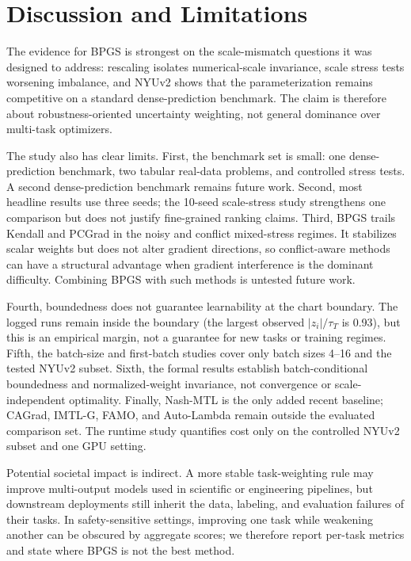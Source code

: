\section{Discussion and Limitations}
The evidence for BPGS is strongest on the scale-mismatch questions it was designed to address:
rescaling isolates numerical-scale invariance, scale stress tests worsening imbalance, and NYUv2
shows that the parameterization remains competitive on a standard dense-prediction benchmark. The
claim is therefore about robustness-oriented uncertainty weighting, not general dominance over
multi-task optimizers.

The study also has clear limits. First, the benchmark set is small: one dense-prediction
benchmark, two tabular real-data problems, and controlled stress tests. A second dense-prediction
benchmark remains future work. Second, most headline results use three seeds; the 10-seed
scale-stress study strengthens one comparison but does not justify fine-grained ranking claims.
Third, BPGS trails Kendall and PCGrad in the noisy and conflict mixed-stress regimes. It
stabilizes scalar weights but does not alter gradient directions, so conflict-aware methods can
have a structural advantage when gradient interference is the dominant difficulty. Combining BPGS
with such methods is untested future work.

Fourth, boundedness does not guarantee learnability at the chart boundary. The logged runs remain
inside the boundary (the largest observed $|z_i|/\tau_T$ is 0.93), but this is an empirical margin,
not a guarantee for new tasks or training regimes. Fifth, the batch-size and first-batch studies
cover only batch sizes 4--16 and the tested NYUv2 subset. Sixth, the formal results establish
batch-conditional boundedness and normalized-weight invariance, not convergence or
scale-independent optimality. Finally, Nash-MTL is the only added recent baseline; CAGrad,
IMTL-G, FAMO, and Auto-Lambda \cite{liu2022autolambda} remain outside the evaluated comparison
set. The runtime study quantifies cost only on the controlled NYUv2 subset and one GPU setting.

Potential societal impact is indirect. A more stable task-weighting rule may improve multi-output
models used in scientific or engineering pipelines, but downstream deployments still inherit the
data, labeling, and evaluation failures of their tasks. In safety-sensitive settings, improving one
task while weakening another can be obscured by aggregate scores; we therefore report per-task
metrics and state where BPGS is not the best method.
